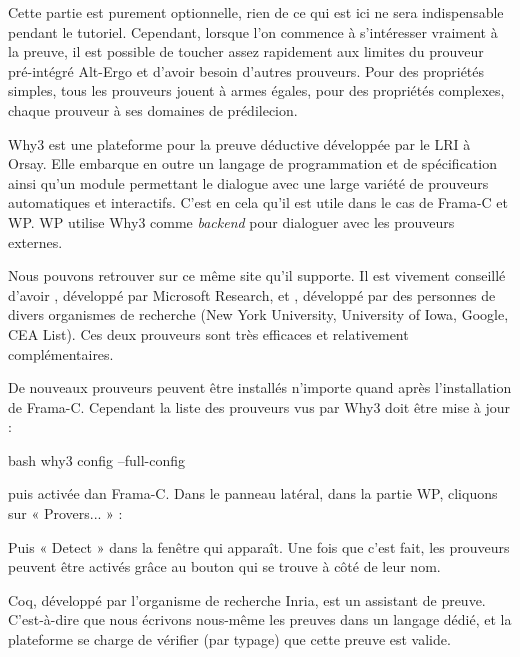 

Cette partie est purement optionnelle, rien de ce qui est ici ne sera
indispensable pendant le tutoriel. Cependant, lorsque l'on commence à
s'intéresser vraiment à la preuve, il est possible de toucher assez rapidement
aux limites du prouveur pré-intégré Alt-Ergo et d'avoir besoin d'autres
prouveurs. Pour des propriétés simples, tous les prouveurs jouent à armes
égales, pour des propriétés complexes, chaque prouveur à ses domaines de
prédilecion.



Why3 est une plateforme pour la preuve déductive développée par le LRI à Orsay.
Elle embarque en outre un langage de programmation et de spécification ainsi
qu'un module permettant le dialogue avec une large variété de prouveurs
automatiques et interactifs. C'est en cela qu'il est utile dans le cas de
Frama-C et WP. WP utilise Why3 comme \textit{backend} pour dialoguer avec les
prouveurs externes.


Nous pouvons retrouver sur ce même site
 qu'il supporte.
Il est vivement conseillé d'avoir ,
développé par Microsoft Research, et ,
développé par des personnes de divers organismes de recherche (New York
University, University of Iowa, Google, CEA List). Ces deux prouveurs sont très
efficaces et relativement complémentaires.


De nouveaux prouveurs peuvent être installés n'importe quand après
l'installation de Frama-C. Cependant la liste des prouveurs vus par Why3
doit être mise à jour :


\begin{CodeBlock}{bash}
why3 config --full-config
\end{CodeBlock}


puis activée dan Frama-C. Dans le panneau latéral, dans la partie WP,
cliquons sur « Provers... » :




Puis « Detect » dans la fenêtre qui apparaît. Une fois que c'est fait,
les prouveurs peuvent être activés grâce au bouton qui se trouve à côté
de leur nom.






Coq, développé par l'organisme de recherche Inria, est un assistant de
preuve. C'est-à-dire que nous écrivons nous-même les preuves dans un
langage dédié, et la plateforme se charge de vérifier (par typage) que
cette preuve est valide.



